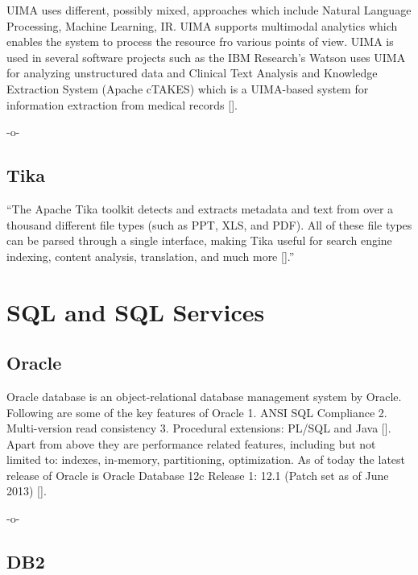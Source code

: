 UIMA uses different, possibly mixed, approaches which include Natural
Language Processing, Machine Learning, IR. UIMA supports multimodal
analytics which enables the system to process the resource fro various
points of view. UIMA is used in several software projects such as the
IBM Research's Watson uses UIMA for analyzing unstructured data and
Clinical Text Analysis and Knowledge Extraction System (Apache cTAKES)
which is a UIMA-based system for information extraction from medical
records [\cite{www-uima-slideshare}].

     -o-
     
\subsection{Tika}

``The Apache Tika toolkit detects and extracts metadata and text from
over a thousand different file types (such as PPT, XLS, and PDF). All
of these file types can be parsed through a single interface, making
Tika useful for search engine indexing, content analysis, translation,
and much more [\cite{www-tika}].''


\section{SQL and SQL Services}
\label{S:o-sql}

\subsection{Oracle}

Oracle database is an object-relational database management system by
Oracle. Following are some of the key features of Oracle 1. ANSI SQL
Compliance 2. Multi-version read consistency 3. Procedural extensions:
PL/SQL and Java [\cite{www-oracle}].  Apart from above they are
performance related features, including but not limited to: indexes,
in-memory, partitioning, optimization.  As of today the latest release
of Oracle is Oracle Database 12c Release 1: 12.1 (Patch set as of June
2013) [\cite{www-oracle}].

     -o-


\subsection{DB2}


